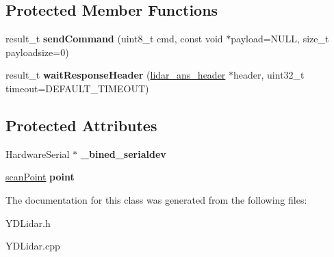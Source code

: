 \subsection*{Protected Member Functions}
\begin{DoxyCompactItemize}
\item 
result\+\_\+t {\bfseries send\+Command} (uint8\+\_\+t cmd, const void $\ast$payload=N\+U\+LL, size\+\_\+t payloadsize=0)\hypertarget{class_y_d_lidar_a440f59fce948f0fe000d8eee48d561c3}{}\label{class_y_d_lidar_a440f59fce948f0fe000d8eee48d561c3}

\item 
result\+\_\+t {\bfseries wait\+Response\+Header} (\hyperlink{structlidar__ans__header}{lidar\+\_\+ans\+\_\+header} $\ast$header, uint32\+\_\+t timeout=D\+E\+F\+A\+U\+L\+T\+\_\+\+T\+I\+M\+E\+O\+UT)\hypertarget{class_y_d_lidar_a05781f62737fead3f02990dfb08aadb5}{}\label{class_y_d_lidar_a05781f62737fead3f02990dfb08aadb5}

\end{DoxyCompactItemize}
\subsection*{Protected Attributes}
\begin{DoxyCompactItemize}
\item 
Hardware\+Serial $\ast$ {\bfseries \+\_\+bined\+\_\+serialdev}\hypertarget{class_y_d_lidar_aaf9925e4f8109c6b52cbd0d61df274c7}{}\label{class_y_d_lidar_aaf9925e4f8109c6b52cbd0d61df274c7}

\item 
\hyperlink{structscan_point}{scan\+Point} {\bfseries point}\hypertarget{class_y_d_lidar_aa6104f0063758211b29f7dece4e158d9}{}\label{class_y_d_lidar_aa6104f0063758211b29f7dece4e158d9}

\end{DoxyCompactItemize}


The documentation for this class was generated from the following files\+:\begin{DoxyCompactItemize}
\item 
Y\+D\+Lidar.\+h\item 
Y\+D\+Lidar.\+cpp\end{DoxyCompactItemize}
